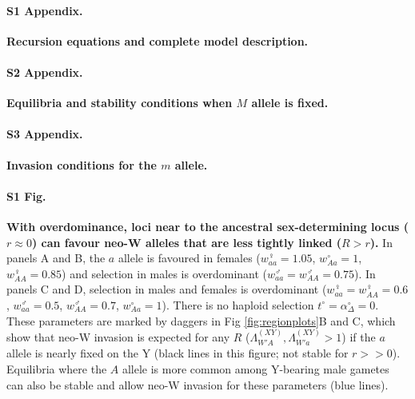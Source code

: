 \documentclass[10pt,letterpaper]{article}
\begin{document}
\paragraph*{S1 Appendix.}
\label{app:recurs}
{\bf Recursion equations and complete model description.} 

\paragraph*{S2 Appendix.}
\label{app:eq_stab}
{\bf Equilibria and stability conditions when $M$ allele is fixed. } 

\paragraph*{S3 Appendix.}
\label{app:inv_cond}
{\bf Invasion conditions for the $m$ allele.} 

\paragraph*{S1 Fig.}
\label{fig:positionOverdominance}
{\bf With overdominance, loci near to the ancestral sex-determining locus ($r\approx0$) can favour neo-W alleles that are less tightly linked ($R>r$).} 
In panels A and B, the $a$ allele is favoured in females ($w_{aa}^\female=1.05$, $w_{Aa}^\circ=1$, $w_{AA}^\female=0.85$) and selection in males is overdominant ($w_{aa}^\male=w_{AA}^\male=0.75$).
In panels C and D, selection in males and females is overdominant ($w_{aa}^\female=w_{AA}^\female=0.6$, $w_{aa}^\male=0.5$, $w_{AA}^\male=0.7$, $w_{Aa}^\circ=1$).
There is no haploid selection $t^\circ = \alpha^\circ_\Delta = 0$.
These parameters are marked by daggers in Fig \ref{fig:regionplots}B and C, which show that neo-W invasion is expected for any $R$ ($\Lambda_{W'A}^{(XY)},\Lambda_{W'a}^{(XY)}>1$) if the $a$ allele is nearly fixed on the Y (black lines in this figure; not stable for $r>>0$). 
Equilibria where the $A$ allele is more common among Y-bearing male gametes can also be stable and allow neo-W invasion for these parameters (blue lines). 
\end{document}
